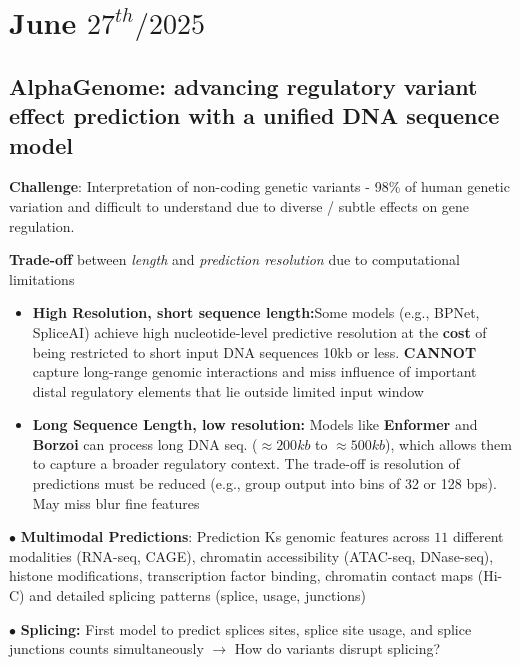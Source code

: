 \documentclass[../main.tex]{subfiles}
\begin{document}
\chapter{June $27^{th} / 2025$}
\label{ch:tufte-design}

\section{AlphaGenome: advancing regulatory variant
effect prediction with a unified DNA sequence
model}\cite{Avsec2024AlphaGenome}

\textbf{Challenge}: Interpretation of non-coding genetic variants - 98\% of human genetic variation and difficult to understand due to diverse / subtle effects on gene regulation.

\vspace{0.3cm}

\textbf{Trade-off} between \textit{length} and \textit{prediction resolution} due to computational limitations

\begin{itemize}
    \item \textbf{High Resolution, short sequence length:}Some models (e.g., BPNet, SpliceAI) achieve high nucleotide-level predictive resolution at the \textbf{cost} of being restricted to short input DNA sequences 10kb or less. \textbf{CANNOT} capture long-range genomic interactions and miss influence of important distal regulatory elements that lie outside limited input window
    \item \textbf{Long Sequence Length, low resolution:} Models like \textbf{Enformer} and \textbf{Borzoi} can process long DNA seq. ($\approx200kb$ to $\approx500kb$), which allows them to capture a broader regulatory context. The trade-off is resolution of predictions must be reduced (e.g., group output into bins of 32 or 128 bps). May miss blur fine features
\end{itemize}

$\bullet$ \textbf{Multimodal Predictions}: Prediction Ks genomic features across $11$ different modalities (RNA-seq, CAGE), chromatin accessibility (ATAC-seq, DNase-seq), histone modifications, transcription factor binding, chromatin contact maps (Hi-C) and detailed splicing patterns (splice, usage, junctions)

\vspace{0.3cm}

$\bullet$ \textbf{Splicing:} First model to predict splices sites, splice site usage, and splice junctions counts simultaneously $\rightarrow$ How do variants disrupt splicing?
\end{document}
